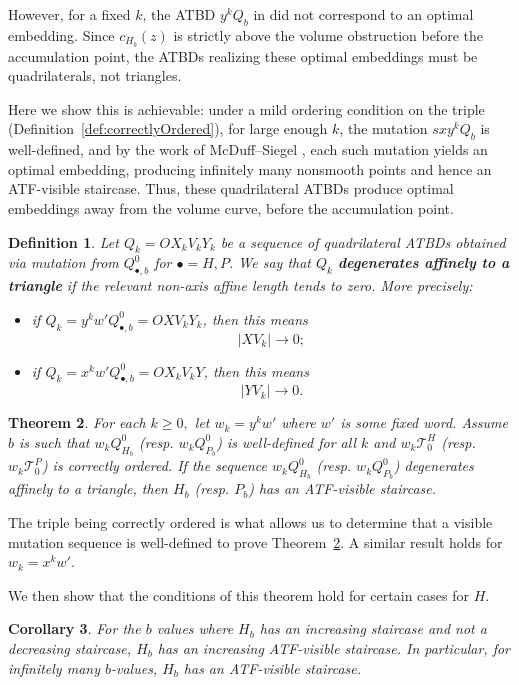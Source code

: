 \documentclass[11pt, reqno]{amsart}
\newtheorem{thm}{Theorem}[subsection]
\newtheorem{cor}[thm]{Corollary}
\newtheorem{definition}[thm]{Definition}
\theoremstyle{remark}
\numberwithin{equation}{subsection}
\numberwithin{figure}{section}
\theoremstyle{customremark}
\newcommand{\Tt}{\mathcal{T}}
\begin{document}
However, for a fixed $k$, the ATBD $y^kQ_b$
in \cite{M1} did not correspond to an optimal embedding. Since $c_{H_b}(z)$ is strictly above the volume obstruction before the accumulation point, the ATBDs realizing these optimal embeddings must be quadrilaterals, not triangles.

Here we show this is achievable: under a mild ordering condition on the triple (Definition~\ref{def:correctlyOrdered}), for large enough $k$, the mutation $sxy^kQ_b$ is well-defined, and by the work of McDuff–Siegel \cite{McSi}, each such mutation yields an optimal embedding, producing infinitely many nonsmooth points and hence an ATF-visible staircase. Thus, these quadrilateral ATBDs produce optimal embeddings away from the
volume curve, before the accumulation point.

\begin{definition}\label{def:affineTriangularDegeneration}
Let \(Q_k=OX_kV_kY_k\) be a sequence of quadrilateral ATBDs obtained via
mutation from \(Q_{\bullet,b}^0\) for $\bullet=H,P$. We say that \(Q_k\) {\bf degenerates
affinely to a triangle} if the relevant non-axis affine length tends to
zero. More precisely:
\begin{itemize}
    \item if \(Q_k=y^kw'Q_{\bullet,b}^0=OXV_kY_k\), then this means
    \[
        |XV_k|\to 0;
    \]
    \item if \(Q_k=x^kw'Q_{\bullet,b}^0=OX_kV_kY\), then this means
    \[
        |YV_k|\to 0.
    \]
\end{itemize}
\end{definition}


\begin{thm} \label{thm:ATFvis}
     For each $k \geq 0,$ let $w_k=y^kw'$ where $w'$ is some fixed word. Assume $b$ is such that $w_kQ_{H_b}^0$ (resp. $w_kQ_{P_b}^0$) is well-defined for all $k$ and $w_k\Tt_0^H$ (resp. $w_k\Tt_0^P$) is correctly ordered. If the sequence $w_kQ_{H_b}^0$ (resp. $w_kQ_{P_b}^0$) degenerates affinely to a triangle, then $H_b$ (resp. $P_b$) has an ATF-visible staircase.  
\end{thm}

The triple being correctly ordered is what allows us to determine that a visible mutation sequence is well-defined to prove Theorem~\ref{thm:ATFvis}. A similar result holds for $w_k=x^kw'$. 

We then show that the conditions of this theorem hold for certain cases for $H.$ 
\begin{cor} \label{cor:ATFvis}
    For the $b$ values where $H_b$ has an increasing staircase and not a decreasing staircase, $H_b$ has an increasing ATF-visible staircase. In particular, for infinitely many $b$-values, $H_b$ has an ATF-visible staircase. 
\end{cor}
\end{document}
